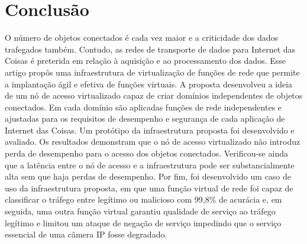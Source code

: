 \documentclass[12pt]{article}
\begin{document}
\section{Conclusão} %
\label{sec:conclusao}

O número de objetos conectados é cada vez maior e a criticidade dos dados trafegados também. Contudo, as redes de transporte de dados para Internet das Coisas é preterida em relação à aquisição e ao processamento dos dados. Esse artigo propôs uma infraestrutura de virtualização de funções de rede que permite a implantação ágil e efetiva de funções virtuais. A proposta desenvolveu a ideia de um nó de acesso virtualizado capaz de criar domínios independentes de objetos conectados. Em cada domínio são aplicadas funções de rede independentes e ajustadas para os requisitos de desempenho e segurança de cada aplicação de Internet das Coisas. Um protótipo da infraestrutura proposta foi desenvolvido e avaliado. Os resultados demonstram que o nó de acesso virtualizado não introduz perda de desempenho para o acesso dos objetos conectados. Verificou-se ainda que a latência entre o nó de acesso e a infraestrutura pode ser substancialmente alta sem que haja perdas de desempenho. Por fim, foi desenvolvido um caso de uso da infraestrutura proposta, em que uma função virtual de rede foi capaz de classificar o tráfego entre legítimo ou malicioso com 99,8\% de acurácia e, em seguida, uma outra função virtual garantiu qualidade de serviço ao tráfego legítimo e limitou um ataque de negação de serviço impedindo que o serviço essencial de uma câmera IP fosse degradado. 


% 
% 

\begin{spacing}{0.85}
\begin{normalsize}




\end{normalsize}
\end{spacing}
\end{document}
